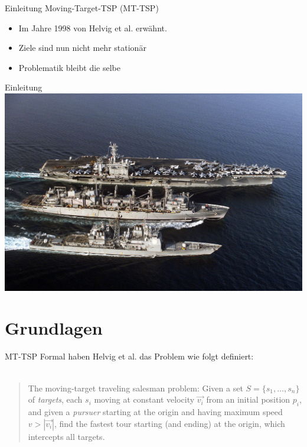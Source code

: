 \documentclass[10pt,table]{beamer}
\begin{document}
\begin{frame}{Einleitung}
Moving-Target-TSP (MT-TSP)
\begin{itemize}
\item
Im Jahre 1998 von Helvig et al. erwähnt.
\item
Ziele sind nun nicht mehr stationär
\item
Problematik bleibt die selbe
\end{itemize}

\end{frame}

\begin{frame}{Einleitung}
\centering
\includegraphics[scale=0.8]{Images/Versorgungsschiff.jpg}
\end{frame}

\section{Grundlagen}
\begin{frame}{MT-TSP}
Formal haben Helvig et al. das Problem wie folgt definiert:\\~\\
\begin{quote}
The moving-target traveling salesman problem: Given a set $S = \{s_1, \dots , s_n\}$ of \emph{targets}, each $s_i$ moving at constant velocity $\overrightarrow{v_i}$ from an initial position $p_i$, and given a \emph{pursuer} starting at the origin and having maximum speed $v>|\overrightarrow{v_i}|$, find the fastest tour starting (and ending) at the origin, which intercepts all targets.
\end{quote}
\end{frame}
\end{document}

